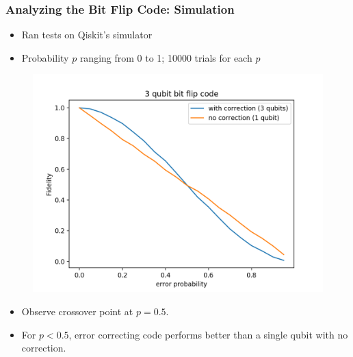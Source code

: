 \documentclass{beamer}
\begin{document}
\begin{frame}
    \frametitle{Analyzing the Bit Flip Code: Simulation}
    \begin{itemize}
        \item Ran tests on Qiskit's simulator
        \item Probability $p$ ranging from 0 to 1; 10000 trials for each $p$
    \end{itemize}
    \begin{minipage}{0.45\textwidth}
        \begin{figure}[H]
        \includegraphics[scale=0.4]{3qb-bf-overlay copy.png}
        \end{figure}
        \end{minipage} \hfill
        \begin{minipage}{0.45\textwidth}
        \begin{itemize}
        \item Observe crossover point at $p=0.5$.
        \item For $p<0.5$, error correcting code performs better than a single qubit with no correction.
        \end{itemize}
    \end{minipage}
\end{frame}

    
\end{document}
